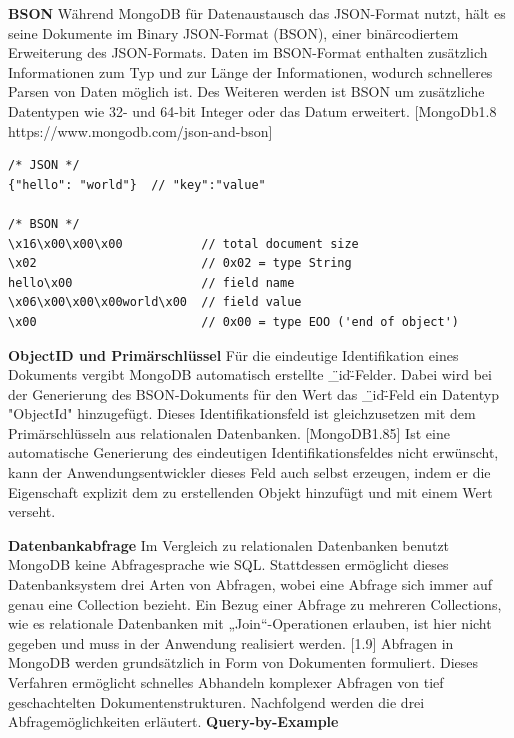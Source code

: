 \textbf{BSON}
\newline
Während MongoDB für Datenaustausch das JSON-Format nutzt, hält es seine Dokumente im Binary JSON-Format (BSON), einer binärcodiertem Erweiterung des JSON-Formats. Daten im BSON-Format enthalten zusätzlich Informationen zum Typ und zur Länge der Informationen, wodurch schnelleres Parsen von Daten möglich ist. Des Weiteren werden ist BSON um zusätzliche Datentypen wie 32- und 64-bit Integer oder das Datum erweitert. [MongoDb1.8 https://www.mongodb.com/json-and-bson] 
\newline

\begin{lstlisting}
/* JSON */
{"hello": "world"}  // "key":"value"

/* BSON */
\x16\x00\x00\x00           // total document size
\x02                       // 0x02 = type String
hello\x00                  // field name
\x06\x00\x00\x00world\x00  // field value
\x00                       // 0x00 = type EOO ('end of object')
\end{lstlisting}



\textbf{ObjectID und Primärschlüssel}
\newline
Für die eindeutige Identifikation eines Dokuments vergibt MongoDB automatisch erstellte \"\_id\"-Felder. Dabei wird bei der Generierung des BSON-Dokuments für den Wert das \"\_id\"-Feld ein Datentyp "ObjectId" hinzugefügt. Dieses Identifikationsfeld ist gleichzusetzen mit dem Primärschlüsseln aus relationalen Datenbanken. [MongoDB1.85] Ist eine automatische Generierung des eindeutigen Identifikationsfeldes nicht erwünscht, kann der Anwendungsentwickler dieses Feld auch selbst erzeugen, indem er die Eigenschaft explizit dem zu erstellenden Objekt hinzufügt und mit einem Wert verseht. 
\newline


\textbf{Datenbankabfrage}
\newline
Im Vergleich zu relationalen Datenbanken benutzt MongoDB keine Abfragesprache wie SQL. Stattdessen ermöglicht dieses Datenbanksystem drei Arten von Abfragen, wobei eine Abfrage sich immer auf genau eine Collection bezieht. Ein Bezug einer Abfrage zu mehreren Collections, wie es relationale Datenbanken mit „Join“-Operationen erlauben, ist hier nicht gegeben und muss in der Anwendung realisiert werden. [1.9] Abfragen in MongoDB werden grundsätzlich in Form von Dokumenten formuliert. Dieses Verfahren ermöglicht schnelles Abhandeln komplexer Abfragen von tief geschachtelten Dokumentenstrukturen. Nachfolgend werden die drei Abfragemöglichkeiten erläutert.
\newline 
\newline
\textbf{Query-by-Example}
\newline

